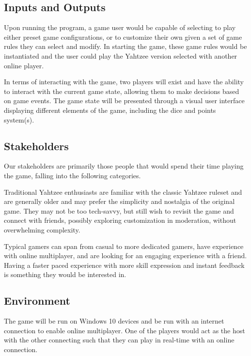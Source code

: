 \documentclass{article}
\begin{document}
\subsection{Inputs and Outputs}

Upon running the program, a game user would be capable of selecting to play either preset game configurations, or to customize their own given a set of game rules they can select and modify. In starting the game, these game rules would be instantiated and the user could play the Yahtzee version selected with another online player.

In terms of interacting with the game, two players will exist and have the ability to interact with the current game state, allowing them to make decisions based on game events. The game state will be presented through a visual user interface displaying different elements of the game, including the dice and points system(s).

\subsection{Stakeholders}

Our stakeholders are primarily those people that would spend their time playing the game, falling into the following categories.

Traditional Yahtzee enthusiasts are familiar with the classic Yahtzee ruleset and are generally older and may prefer the simplicity and nostalgia of the original game. They may not be too tech-savvy, but still wish to revisit the game and connect with friends, possibly exploring customization in moderation, without overwhelming complexity.

Typical gamers can span from casual to more dedicated gamers, have experience with online multiplayer, and are looking for an engaging experience with a friend. Having a faster paced experience with more skill expression and instant feedback is something they would be interested in.


\subsection{Environment}


The game will be run on Windows 10 devices and be run with an internet connection to enable online multiplayer. One of the players would act as the host with the other connecting such that they can play in real-time with an online connection.
\end{document}
